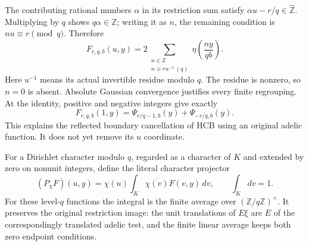 \documentclass[11pt]{article}
\begin{document}
The contributing rational numbers $\alpha$ in its restriction
sum satisfy $\alpha u-r/q\in\widehat{\mathbb Z}$.
Multiplying by $q$ shows $q\alpha\in\mathbb Z$; writing it
as $n$, the remaining condition is $nu\equiv r\pmod q$.
Therefore
\begin{equation}\tag{RMB2}
 F_{r,q,b}(u,y)
   =2\sum_{\substack{n\in\mathbb Z\\n\equiv ru^{-1}\ (q)}}
                \eta\!\left(\frac{ny}{qb}\right).
\end{equation}
Here $u^{-1}$ means its actual invertible residue modulo $q$.
The residue is nonzero, so $n=0$ is absent. Absolute Gaussian
convergence justifies every finite regrouping. At the identity,
positive and negative integers give exactly
\begin{equation}\tag{RMB3}
 F_{r,q,b}(1,y)=
   \Psi_{r/q-1,b}(y)+\Psi_{-r/q,b}(y).
\end{equation}
This explains the reflected boundary cancellation of HCB using
an original adelic function. It does not yet remove its $u$ coordinate.

For a Dirichlet character modulo $q$, regarded as a character
of $K$ and extended by zero on nonunit integers, define the
literal character projector
\begin{equation}\tag{RMB4}
 (P_\chi F)(u,y)=
       \chi(u)\int_K\overline{\chi(v)}F(v,y)\,dv,
 \qquad \int_Kdv=1.
\end{equation}
For these level-$q$ functions the integral is the finite
average over $(\mathbb Z/q\mathbb Z)^\times$. It preserves
the original restriction image: the unit translations of $E\xi$
are $E$ of the correspondingly translated adelic test, and
the finite linear average keeps both zero endpoint conditions.
\end{document}
